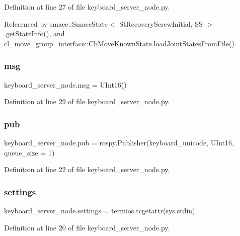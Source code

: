 Definition at line 27 of file keyboard\+\_\+server\+\_\+node.\+py.



Referenced by smacc\+::\+Smacc\+State$<$ St\+Recovery\+Screw\+Initial, S\+S $>$.\+get\+State\+Info(), and cl\+\_\+move\+\_\+group\+\_\+interface\+::\+Cb\+Move\+Known\+State.\+load\+Joint\+States\+From\+File().

\mbox{\label{namespacekeyboard__server__node_a555024e72f3e57503b0eebad2546fc72}} 
\subsubsection{\texorpdfstring{msg}{msg}}
{\footnotesize\ttfamily keyboard\+\_\+server\+\_\+node.\+msg = U\+Int16()}



Definition at line 29 of file keyboard\+\_\+server\+\_\+node.\+py.

\mbox{\label{namespacekeyboard__server__node_acb9a153a1e2ddb5dab254f49ade8512e}} 
\subsubsection{\texorpdfstring{pub}{pub}}
{\footnotesize\ttfamily keyboard\+\_\+server\+\_\+node.\+pub = rospy.\+Publisher(\textquotesingle{}keyboard\+\_\+unicode\textquotesingle{}, U\+Int16, queue\+\_\+size = 1)}



Definition at line 22 of file keyboard\+\_\+server\+\_\+node.\+py.

\mbox{\label{namespacekeyboard__server__node_ade1a45e58d917f8cdb07d1d54ac6bd34}} 
\subsubsection{\texorpdfstring{settings}{settings}}
{\footnotesize\ttfamily keyboard\+\_\+server\+\_\+node.\+settings = termios.\+tcgetattr(sys.\+stdin)}



Definition at line 20 of file keyboard\+\_\+server\+\_\+node.\+py.


